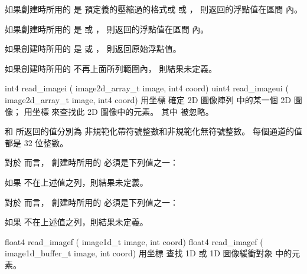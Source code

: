如果創建時所用的  是
預定義的壓縮過的格式或  或 ，
則返回的浮點值在區間 \math{[0.0 \cdots 1.0]} 內。

如果創建時所用的  是
  或 ，
則返回的浮點值在區間 \math{[-1.0 \cdots 1.0]} 內。

如果創建時所用的  是
  或 ，
則返回原始浮點值。

如果創建時所用的  不再上面所列範圍內，
則結果未定義。
\stopbuffer

int4 read_imagei (
	image2d_array_t image,
	int4 coord)
uint4 read_imageui (
	image2d_array_t image,
	int4 coord)
\stopbuffer
{}
用坐標  確定 2D 圖像陣列  中的某一個 2D 圖像；
用坐標  來查找此 2D 圖像中的元素。
其中  被忽略。

 和  所返回的值分別為
非規範化帶符號整數和非規範化無符號整數。
每個通道的值都是 32 位整數。

對於  而言，
創建時所用的  必須是下列值之一：
\startigBase[indentnext=no]
\item {}
\item {}
\item {}
\stopigBase
如果  不在上述值之列，則結果未定義。

對於  而言，
創建時所用的  必須是下列值之一：
\startigBase[indentnext=no]
\item {}
\item {}
\item {}
\stopigBase
如果  不在上述值之列，則結果未定義。
\stopbuffer

float4 read_imagef (
	image1d_t image,
	int coord)
float4 read_imagef (
	image1d_buffer_t image,
	int coord)
\stopbuffer
{}
用坐標  查找 1D 或 1D 圖像緩衝對象  中的元素。

